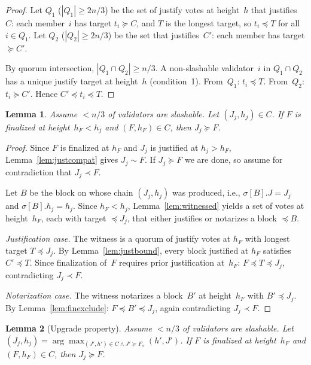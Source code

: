 \documentclass{article}
\theoremstyle{plain}
\newtheorem{lemma}{Lemma}
\theoremstyle{definition}
\theoremstyle{remark}
\begin{document}
\begin{proof}
Let $Q_1$ ($|Q_1| \geq 2n/3$) be the set of justify votes at height~$h$ that justifies~$C$: each member~$i$ has target $t_i \succeq C$, and $T$ is the longest target, so $t_i \preceq T$ for all $i \in Q_1$.
Let $Q_2$ ($|Q_2| \geq 2n/3$) be the set that justifies~$C'$: each member has target $\succeq C'$.

By quorum intersection, $|Q_1 \cap Q_2| \geq n/3$.
A non-slashable validator~$i$ in $Q_1 \cap Q_2$ has a unique justify target at height~$h$ (condition~1).
From~$Q_1$: $t_i \preceq T$.
From~$Q_2$: $t_i \succeq C'$.
Hence $C' \preceq t_i \preceq T$.
\end{proof}




\begin{lemma}\label{lem:upgrade-helper}
  Assume $< n/3$ of validators are slashable.
  Let $(J_j, h_j) \in C$.
  If $F$ is finalized at height~$h_F < h_j$ and $(F, h_F) \in C$, then $J_j \succeq F$.
\end{lemma}

\begin{proof}
Since $F$ is finalized at $h_F$ and $J_j$ is justified at $h_j > h_F$, Lemma~\ref{lem:justcompat} gives $J_j \sim F$.
If $J_j \succeq F$ we are done, so assume for contradiction that $J_j \prec F$.

Let $B$ be the block on whose chain $(J_j, h_j)$ was produced, i.e., $\sigma[B].J = J_j$ and $\sigma[B].h_j = h_j$.
Since $h_F < h_j$, Lemma~\ref{lem:witnessed} yields a set of votes at height~$h_F$, each with target $\preceq J_j$, that either justifies or notarizes a block $\preceq B$.

\emph{Justification case.}
The witness is a quorum of justify votes at $h_F$ with longest target $T \preceq J_j$.
By Lemma~\ref{lem:justbound}, every block justified at $h_F$ satisfies $C' \preceq T$.
Since finalization of~$F$ requires prior justification at~$h_F$: $F \preceq T \preceq J_j$, contradicting $J_j \prec F$.

\emph{Notarization case.}
The witness notarizes a block~$B'$ at height~$h_F$ with $B' \preceq J_j$.
By Lemma~\ref{lem:finexclude}: $F \preceq B' \preceq J_j$, again contradicting $J_j \prec F$.
\end{proof}

\begin{lemma}[Upgrade property]\label{lem:upgrade}
  Assume $< n/3$ of validators are slashable.
  Let $(J_j, h_j) = \arg\max_{(J',h')\in C \land J' \succeq F_s}(h', J')$.
  If $F$ is finalized at height~$h_F$ and $(F, h_F) \in C$, then $J_j \succeq F$.
\end{lemma}
\end{document}
